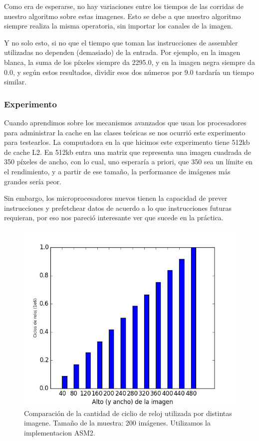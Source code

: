 Como era de esperarse, no hay variaciones entre los tiempos de las corridas de nuestro algoritmo sobre estas imagenes. Esto se debe a que nuestro algoritmo siempre realiza la misma operatoria, sin importar los canales de la imagen.

Y no solo esto, si no que el tiempo que toman las instrucciones de assembler utilizadas no dependen (demasiado) de la entrada. Por ejemplo, en la imagen blanca, la suma de los píxeles siempre da 2295.0, y en la imagen negra siempre da 0.0, y según estos resultados, dividir esos dos números por 9.0 tardaría un tiempo similar.


\subsubsection*{Experimento}
Cuando aprendimos sobre los mecanismos avanzados que usan los procesadores para administrar la cache en las clases teóricas se nos ocurrió este experimento para testearlos. La computadora en la que hicimos este experimento tiene 512kb de cache L2. En 512kb entra una matriz que representa una imagen cuadrada de 350 píxeles de ancho, con lo cual, uno esperaría a priori, que 350 sea un límite en el rendimiento, y a partir de ese tamaño, la performance de imágenes más grandes sería peor.

Sin embargo, los microprocesadores nuevos tienen la capacidad de prever instrucciones y prefetchear datos de acuerdo a lo que instrucciones futuras requieran, por eso nos pareció interesante ver que sucede en la práctica.

\begin{figure}[H] 
	\centering
  \includegraphics[scale=0.7]{images/blur-cache.png}
  \caption{Comparación de la cantidad de ciclio de reloj utilizada por distintas imagene. Tamaño de la muestra: 200 imágenes. Utilizamos la implementacion ASM2.}
\end{figure}

